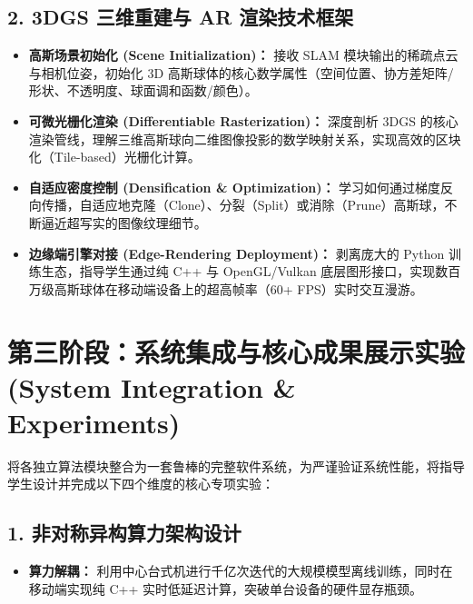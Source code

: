 \documentclass[11pt, a4paper]{ctexart}
\begin{document}
\subsection{2. 3DGS 三维重建与 AR 渲染技术框架}
\begin{itemize}[label=$\bullet$]
    \item \textbf{高斯场景初始化 (Scene Initialization)：} 接收 SLAM 模块输出的稀疏点云与相机位姿，初始化 3D 高斯球体的核心数学属性（空间位置、协方差矩阵/形状、不透明度、球面调和函数/颜色）。
    \item \textbf{可微光栅化渲染 (Differentiable Rasterization)：} 深度剖析 3DGS 的核心渲染管线，理解三维高斯球向二维图像投影的数学映射关系，实现高效的区块化（Tile-based）光栅化计算。
    \item \textbf{自适应密度控制 (Densification \& Optimization)：} 学习如何通过梯度反向传播，自适应地克隆（Clone）、分裂（Split）或消除（Prune）高斯球，不断逼近超写实的图像纹理细节。
    \item \textbf{边缘端引擎对接 (Edge-Rendering Deployment)：} 剥离庞大的 Python 训练生态，指导学生通过纯 C++ 与 OpenGL/Vulkan 底层图形接口，实现数百万级高斯球体在移动端设备上的超高帧率（60+ FPS）实时交互漫游。
\end{itemize}

\section{第三阶段：系统集成与核心成果展示实验 (System Integration \& Experiments)}

将各独立算法模块整合为一套鲁棒的完整软件系统，为严谨验证系统性能，将指导学生设计并完成以下四个维度的核心专项实验：

\subsection{1. 非对称异构算力架构设计}
\begin{itemize}[label=$\bullet$]
    \item \textbf{算力解耦：} 利用中心台式机进行千亿次迭代的大规模模型离线训练，同时在移动端实现纯 C++ 实时低延迟计算，突破单台设备的硬件显存瓶颈。
\end{itemize}
\end{document}
